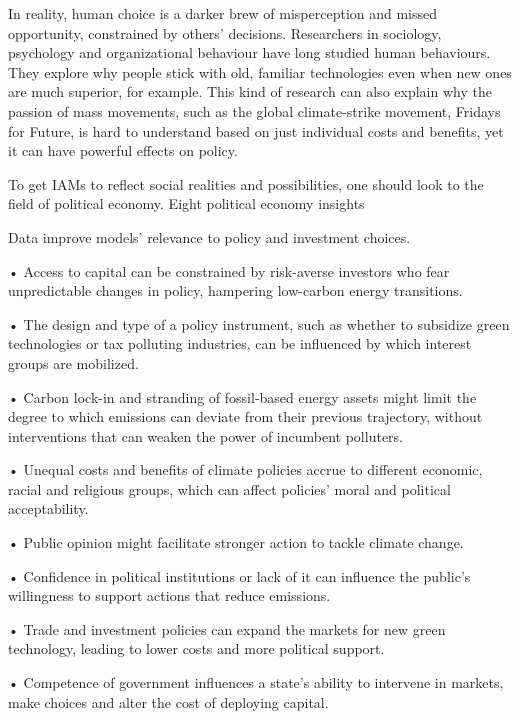 \documentclass[
]{book}
\begin{document}
In reality, human choice is a darker brew of misperception and missed opportunity, constrained by others' decisions. Researchers in sociology, psychology and organizational behaviour have long studied human behaviours. They explore why people stick with old, familiar technologies even when new ones are much superior, for example. This kind of research can also explain why the passion of mass movements, such as the global climate-strike movement, Fridays for Future, is hard to understand based on just individual costs and benefits, yet it can have powerful effects on policy.

To get IAMs to reflect social realities and possibilities, one should look to the field of political economy.
Eight political economy insights

Data improve models' relevance to policy and investment choices.

• Access to capital can be constrained by risk-averse investors who fear unpredictable changes in policy, hampering low-carbon energy transitions.

• The design and type of a policy instrument, such as whether to subsidize green technologies or tax polluting industries, can be influenced by which interest groups are mobilized.

• Carbon lock-in and stranding of fossil-based energy assets might limit the degree to which emissions can deviate from their previous trajectory, without interventions that can weaken the power of incumbent polluters.

• Unequal costs and benefits of climate policies accrue to different economic, racial and religious groups, which can affect policies' moral and political acceptability.

• Public opinion might facilitate stronger action to tackle climate change.

• Confidence in political institutions or lack of it can influence the public's willingness to support actions that reduce emissions.

• Trade and investment policies can expand the markets for new green technology, leading to lower costs and more political support.

• Competence of government influences a state's ability to intervene in markets, make choices and alter the cost of deploying capital.
\end{document}

